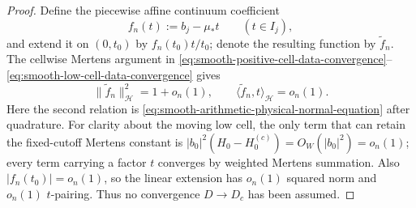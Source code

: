 \documentclass[11pt]{article}
\numberwithin{equation}{section}
\theoremstyle{definition}
\theoremstyle{remark}
\newcommand{\1}{\mathbf 1}
\begin{document}
\begin{proof}
Define the piecewise affine continuum coefficient
\[
 f_n(t):=b_j-\mu_*t\qquad(t\in I_j),
\]
and extend it on \((0,t_0)\) by
\(f_n(t_0)t/t_0\); denote the resulting function by
\(\widetilde f_n\).  The cellwise Mertens argument in
\eqref{eq:smooth-positive-cell-data-convergence}--
\eqref{eq:smooth-low-cell-data-convergence} gives
\begin{equation}
 \|\widetilde f_n\|_{\mathcal H}^2=1+o_n(1),\qquad
 \langle\widetilde f_n,t\rangle_{\mathcal H}=o_n(1).
 \label{eq:smooth-minimizer-continuum-norm-gauge}
\end{equation}
Here the second relation is
\eqref{eq:smooth-arithmetic-physical-normal-equation} after quadrature.
For clarity about the moving low cell, the only term that can retain the
fixed-cutoff Mertens constant is
\(|b_0|^2(H_0-H_0^{(c)})=O_W(|b_0|^2)=o_n(1)\); every term carrying a
factor \(t\) converges by weighted Mertens summation.  Also
\(|f_n(t_0)|=o_n(1)\), so the linear extension has \(o_n(1)\) squared
norm and \(o_n(1)\) \(t\)-pairing.  Thus no convergence \(D\to D_c\) has
been assumed.


\end{proof}
\end{document}
